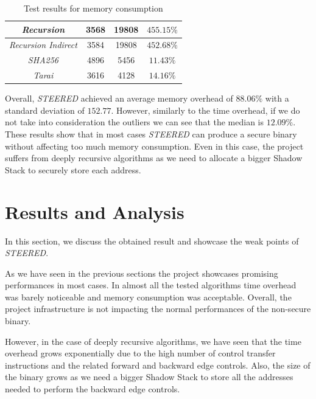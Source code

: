 \begin{table}
\begin{tabular}{|c|c|c|c|}
    \hline
    \textit{Recursion}                   & 3568                         & 19808                        & $455.15\%$               \\
    \hline
    \textit{Recursion Indirect}          & 3584                         & 19808                        & $452.68\%$               \\
    \hline
    \textit{SHA256}                      & 4896                         & 5456                         & $11.43\%$                \\
    \hline
    \textit{Tarai}                       & 3616                         & 4128                         & $14.16\%$                \\
    \hline
  \end{tabular}
  \caption{Test results for memory consumption}
  \label{tab:binsize}
\end{table}

Overall, \textit{STEERED} achieved an average memory overhead of $88.06\%$ with a
standard deviation of $152.77$. However, similarly to the time overhead, if we
do not take into consideration the outliers we can see that the median is
$1 2.09 \%$. These results show that in most cases \textit{STEERED} can produce
a secure binary without affecting too much memory consumption. Even in this case,
the project suffers from deeply recursive algorithms as we need to allocate a
bigger Shadow Stack to securely store each address.

\section{Results and Analysis}
\label{sec:pa_results}

In this section, we discuss the obtained result and showcase the weak points of
\textit{STEERED}.

As we have seen in the previous sections the project showcases promising performances
in most cases. In almost all the tested algorithms time overhead was barely
noticeable and memory consumption was acceptable. Overall, the project
infrastructure is not impacting the normal performances of the non-secure binary.

However, in the case of deeply recursive algorithms, we have seen that the time
overhead grows exponentially due to the high number of control transfer
instructions and the related forward and backward edge controls. Also, the size
of the binary grows as we need a bigger Shadow Stack to store all the addresses
needed to perform the backward edge controls.

